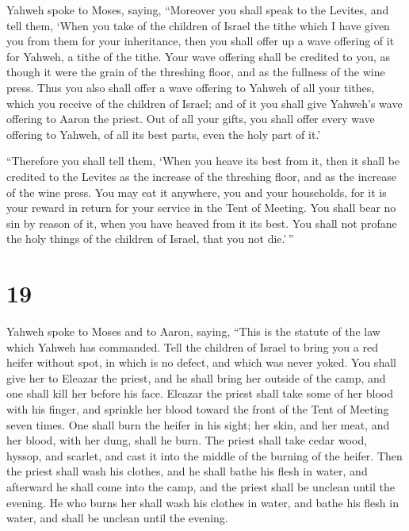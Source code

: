  Yahweh spoke to Moses, saying, 
``Moreover you shall speak to the Levites, and tell them, `When you take
of the children of Israel the tithe which I have given you from them for
your inheritance, then you shall offer up a wave offering of it for
Yahweh, a tithe of the tithe.  Your wave offering shall
be credited to you, as though it were the grain of the threshing floor,
and as the fullness of the wine press.  Thus you also
shall offer a wave offering to Yahweh of all your tithes, which you
receive of the children of Israel; and of it you shall give Yahweh's
wave offering to Aaron the priest.  Out of all your
gifts, you shall offer every wave offering to Yahweh, of all its best
parts, even the holy part of it.'

 ``Therefore you shall tell them, `When you heave its
best from it, then it shall be credited to the Levites as the increase
of the threshing floor, and as the increase of the wine press.
 You may eat it anywhere, you and your households, for it
is your reward in return for your service in the Tent of Meeting.
 You shall bear no sin by reason of it, when you have
heaved from it its best. You shall not profane the holy things of the
children of Israel, that you not die.'\,''

\hypertarget{section-18}{%
\section{19}\label{section-18}}

 Yahweh spoke to Moses and to Aaron, saying,
 ``This is the statute of the law which Yahweh has
commanded. Tell the children of Israel to bring you a red heifer without
spot, in which is no defect, and which was never yoked. 
You shall give her to Eleazar the priest, and he shall bring her outside
of the camp, and one shall kill her before his face. 
Eleazar the priest shall take some of her blood with his finger, and
sprinkle her blood toward the front of the Tent of Meeting seven times.
 One shall burn the heifer in his sight; her skin, and her
meat, and her blood, with her dung, shall he burn.  The
priest shall take cedar wood, hyssop, and scarlet, and cast it into the
middle of the burning of the heifer.  Then the priest
shall wash his clothes, and he shall bathe his flesh in water, and
afterward he shall come into the camp, and the priest shall be unclean
until the evening.  He who burns her shall wash his
clothes in water, and bathe his flesh in water, and shall be unclean
until the evening.

